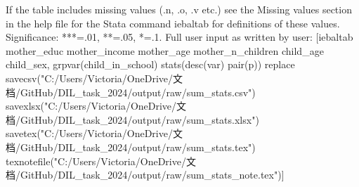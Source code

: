 If the table includes missing values (.n, .o, .v etc.) see the Missing values section in the help file for the Stata command iebaltab for definitions of these values. Significance: ***=.01, **=.05, *=.1. Full user input as written by user: [iebaltab mother\_educ mother\_income mother\_age mother\_n\_children child\_age child\_sex, grpvar(child\_in\_school) stats(desc(var) pair(p)) replace savecsv("C:/Users/Victoria/OneDrive/文档/GitHub/DIL\_task\_2024/output/raw/sum\_stats.csv") savexlsx("C:/Users/Victoria/OneDrive/文档/GitHub/DIL\_task\_2024/output/raw/sum\_stats.xlsx") savetex("C:/Users/Victoria/OneDrive/文档/GitHub/DIL\_task\_2024/output/raw/sum\_stats.tex") texnotefile("C:/Users/Victoria/OneDrive/文档/GitHub/DIL\_task\_2024/output/raw/sum\_stats\_note.tex")] 
